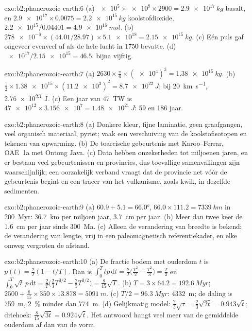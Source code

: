 \begin{solution}{exo:b2:phanerozoic-earth:6}
(a) $\num{e5} \times \num{e9} \times 2900 = \qty{2.9e17}{kg}$ basalt, en $\num{2.9e17}
\times 0.0075 = \qty{2.2e15}{kg}$ koolstofdioxide, $\num{2.2e15}/0.04401 = \qty{4.9e16}{mol}$.
(b) $\num{278e-6} \times (44.01/28.97) \times \num{5.1e18} = \qty{2.15e15}{kg}$. (c) Eén puls
gaf ongeveer evenveel af als de hele lucht in 1750 bevatte. (d) $\num{e17}/\num{2.15e15} = 46.5$: bijna vijftig.
\end{solution}

\begin{solution}{exo:b2:phanerozoic-earth:7}
(a) $2630 \times \frac{\pi}{6} \times (\num{e4})^3 = \qty{1.38e15}{kg}$. (b) $\tfrac12 \times
\num{1.38e15} \times (\num{11.2e3})^2 = \qty{8.7e22}{J}$; bij \qty{20}{km.s^{-1}},
\qty{2.76e23}{J}. (c) Een jaar van \qty{47}{TW} is $\num{47e12} \times \num{3.156e7} =
\qty{1.48e21}{J}$: 59 en 186 jaar.
\end{solution}

\begin{solution}{exo:b2:phanerozoic-earth:8}
(a) Donkere kleur, fijne laminatie, geen graafgangen, veel organisch materiaal, pyriet; vaak een verschuiving van de
koolstofisotopen en tekenen van opwarming. (b) De toarcische gebeurtenis met Karoo--Ferrar, OAE~1a met
Ontong Java. (c) Data hebben onzekerheden tot miljoenen jaren, en er bestaan veel gebeurtenissen en
provincies, dus toevallige samenvallingen zijn waarschijnlijk; een oorzakelijk verband vraagt dat de provincie
net vóór de gebeurtenis begint en een tracer van het vulkanisme, zoals kwik, in dezelfde sedimenten.
\end{solution}

\begin{solution}{exo:b2:phanerozoic-earth:9}
(a) $60.9 + 5.1 = \ang{66.0}$, $66.0 \times 111.2 = \qty{7339}{km}$ in \qty{200}{Myr}:
\qty{36.7}{km} per miljoen jaar, \qty{3.7}{cm} per jaar. (b) Meer dan twee keer de
\qty{1.6}{cm} per jaar sinds \qty{300}{Ma}. (c) Alleen de verandering van breedte is bekend; de verandering van
lengte, vrij in een paleomagnetisch referentiekader, en elke omweg vergroten de afstand.
\end{solution}

\begin{solution}{exo:b2:phanerozoic-earth:10}
(a) De fractie bodem met ouderdom $t$ is $p(t) = \frac2T(1 - t/T)$. Dan is $\int_0^T tp\,\mathrm{d}t =
\frac2T\bigl(\frac{T^2}2 - \frac{T^2}3\bigr) = \frac T3$ en $\int_0^T \sqrt t\,p\,\mathrm{d}t =
\frac2T\bigl(\frac23 T^{3/2} - \frac25 T^{3/2}\bigr) = \frac8{15}\sqrt T$. (b) $T = 3 \times 64.2 =
\qty{192.6}{Myr}$; $2500 + \frac8{15} \times 350 \times 13.878 = \qty{5091}{m}$. (c) $T/2 =
\qty{96.3}{Myr}$: \qty{4332}{m}; de daling is \qty{759}{m}, \qty{2}{\percent} minder dan
\qty{774}{m}. (d) Gelijkmatig model: $\frac23\sqrt\tau = \frac23\sqrt{2\bar t} = 0.943\sqrt{\bar t}$;
driehoek: $\frac8{15}\sqrt{3\bar t} = 0.924\sqrt{\bar t}$. Het antwoord hangt veel meer van de gemiddelde ouderdom
af dan van de vorm.
\end{solution}

